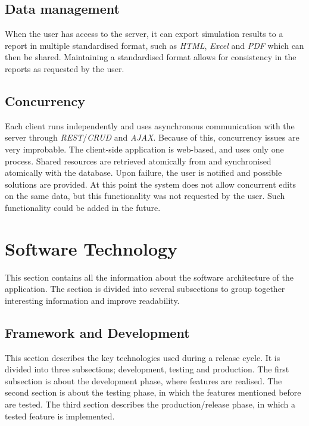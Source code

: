 \documentclass{report}
\begin{document}
		\subsection{Data management}
			When the user has access to the server, it can export simulation results to a report in multiple standardised format, such as \emph{HTML}, \emph{Excel} and \emph{PDF} which can then be shared. Maintaining a standardised format allows for consistency in the reports as requested by the user.		
	
		\subsection{Concurrency}
			Each client runs independently and uses asynchronous communication with the server through \emph{REST}/\emph{CRUD} and \emph{AJAX}. Because of this, concurrency issues are very improbable. The client-side application is web-based, and uses only one process. Shared resources are retrieved atomically from and synchronised atomically with the database. Upon failure, the user is notified and possible solutions are provided. At this point the system does not allow concurrent edits on the same data, but this functionality was not requested by the user. Such functionality could be added in the future.\\		
			
	\clearpage
	\section{Software Technology}
		This section contains all the information about the software architecture of the application. The section is divided into several subsections to group together interesting information and improve readability.	
		
		\subsection{Framework and Development}
			This section describes the key technologies used during a release cycle.
			It is divided into three subsections; development, testing and production.
			The first subsection is about the development phase, where features are realised.
			The second section is about the testing phase, in which the features mentioned before are tested.
			The third section describes the production/release phase, in which a tested feature is implemented.
			
\end{document}
